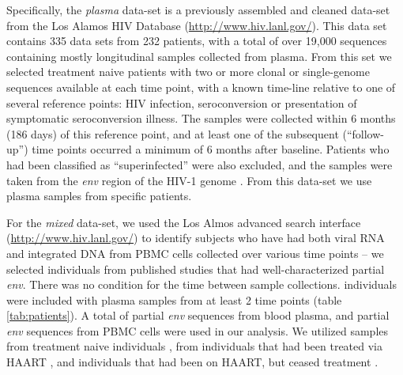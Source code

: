 Specifically, the {\em plasma} data-set \citep{McCloskey14} is a previously assembled and cleaned data-set from the Los Alamos HIV Database (\href{http://www.hiv.lanl.gov/}{http://www.hiv.lanl.gov/}). 
This data set contains 335 data sets from 232 patients, with a total of over 19,000 sequences \citep{McCloskey14} containing mostly longitudinal samples collected from plasma. 
From this set we selected treatment naive patients with two or more clonal or single-genome sequences available at each time point, with a known time-line relative to one of several reference points: HIV infection, seroconversion or presentation of symptomatic seroconversion illness. 
The samples were collected within 6 months (186 days) of this reference point, and at least one of the subsequent (“follow-up”) time points occurred a minimum of 6 months after baseline.
Patients who had been classified as ``superinfected'' were also excluded, and the samples were taken from the {\em env} region of the HIV-1 genome \citep{McCloskey14}. 
From this data-set we use  plasma samples from  specific patients. 


For the {\em mixed} data-set, we used the Los Almos advanced search interface (\href{http://www.hiv.lanl.gov/}{http://www.hiv.lanl.gov/}) to identify subjects who have had both viral RNA and integrated DNA from PBMC cells collected over various time points -- we selected individuals from published studies that had well-characterized partial {\em env}. 
There was no condition for the time between sample collections. 
 individuals were included with plasma samples from at least 2 time points (table \ref{tab:patients}).
A total of  partial {\em env} sequences from blood plasma, and  partial {\em env} sequences from PBMC cells were used in our analysis. 
We utilized samples from treatment naive individuals \citep{Shankarappa99, Novitsky09}, from individuals that had been treated via HAART \citep{Llewellyn06}, and individuals that had been on HAART, but ceased treatment \citep{Fischer04}. 
 
